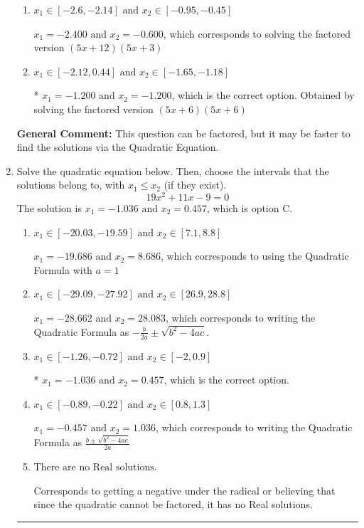 \documentclass{extbook}[14pt]
\newcommand{\litem}[1]{\item #1

\rule{\textwidth}{0.4pt}}
\begin{document}
\begin{enumerate}
{\begin{enumerate}[label=\Alph*.]
$x_1 = -3.600 \text{ and } x_2 = -0.400$, which corresponds to solving the factored version $(5x + 18)(5x + 2)$
\item \( x_1 \in [-2.6, -2.14] \text{ and } x_2 \in [-0.95, -0.45] \)

$x_1 = -2.400 \text{ and } x_2 = -0.600$, which corresponds to solving the factored version $(5x + 12)(5x + 3)$
\item \( x_1 \in [-2.12, 0.44] \text{ and } x_2 \in [-1.65, -1.18] \)

* $x_1 = -1.200 \text{ and } x_2 = -1.200$, which is the correct option. Obtained by solving the factored version $(5x + 6)(5x + 6)$
\end{enumerate}

\textbf{General Comment:} This question can be factored, but it may be faster to find the solutions via the Quadratic Equation.
}
\litem{
Solve the quadratic equation below. Then, choose the intervals that the solutions belong to, with $x_1 \leq x_2$ (if they exist).
\[ 19x^{2} +11 x -9 = 0 \]The solution is \( x_1 = -1.036 \text{ and } x_2 = 0.457 \), which is option C.\begin{enumerate}[label=\Alph*.]
\item \( x_1 \in [-20.03, -19.59] \text{ and } x_2 \in [7.1, 8.8] \)

 $x_1 = -19.686 \text{ and } x_2 = 8.686$, which corresponds to using the Quadratic Formula with $a=1$
\item \( x_1 \in [-29.09, -27.92] \text{ and } x_2 \in [26.9, 28.8] \)

 $x_1 = -28.662 \text{ and } x_2 = 28.083$, which corresponds to writing the Quadratic Formula as $-\frac{b}{2a} \pm \sqrt{b^2 - 4ac}$.
\item \( x_1 \in [-1.26, -0.72] \text{ and } x_2 \in [-2, 0.9] \)

* $x_1 = -1.036 \text{ and } x_2 = 0.457$, which is the correct option.
\item \( x_1 \in [-0.89, -0.22] \text{ and } x_2 \in [0.8, 1.3] \)

 $x_1 = -0.457 \text{ and } x_2 = 1.036$, which corresponds to writing the Quadratic Formula as $\frac{b \pm \sqrt{b^2 - 4ac}}{2a}$
\item \( \text{There are no Real solutions.} \)

Corresponds to getting a negative under the radical or believing that since the quadratic cannot be factored, it has no Real solutions.
\end{enumerate}

}
\end{enumerate}
\end{document}
